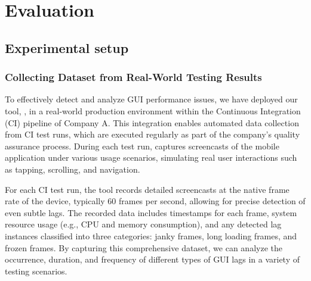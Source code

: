 \section{Evaluation}
\label{sec:evaluation}

\subsection{Experimental setup}
\label{sec:setup}
\subsubsection{Collecting Dataset from Real-World Testing Results} 

To effectively detect and analyze GUI performance issues, we have deployed our tool, \tool, in a real-world production environment within the Continuous Integration (CI) pipeline of Company A. This integration enables automated data collection from CI test runs, which are executed regularly as part of the company’s quality assurance process. During each test run, \tool captures screencasts of the mobile application under various usage scenarios, simulating real user interactions such as tapping, scrolling, and navigation.

For each CI test run, the tool records detailed screencasts at the native frame rate of the device, typically 60 frames per second, allowing for precise detection of even subtle lags. The recorded data includes timestamps for each frame, system resource usage (e.g., CPU and memory consumption), and any detected lag instances classified into three categories: janky frames, long loading frames, and frozen frames. By capturing this comprehensive dataset, we can analyze the occurrence, duration, and frequency of different types of GUI lags in a variety of testing scenarios.


